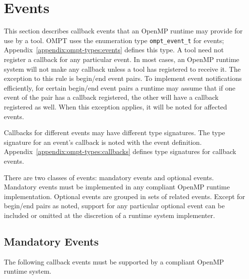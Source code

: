 \documentclass{article}
\newcommand{\descheader}[1]{{\needspace{3\baselineskip}\vspace{1em}\noindent \fbox{#1}}}
\begin{document}
\section{Events}
\label{sec:events} 

This section describes callback events that an OpenMP runtime 
may provide for use by a tool. OMPT uses the enumeration type \verb|ompt_event_t| for events; 
Appendix~\ref{appendix:ompt-types:events} defines this type. 
A tool need not register a callback for any particular event.
In most cases, an OpenMP runtime system will not make any callback unless a  tool has registered to receive it. The exception to this rule is begin/end event pairs. 
To implement event notifications efficiently, for certain begin/end event pairs a runtime may assume that if one event of the pair has a callback registered, the other will have a callback registered as well. When this exception applies, it will be noted for affected events.

Callbacks for different events may have different type signatures. 
The type signature for an event's callback is noted with the event definition.  Appendix~\ref{appendix:ompt-types:callbacks} defines type signatures for callback events.


There are two classes of events: mandatory events and optional events.
Mandatory events must be implemented in any compliant OpenMP runtime implementation. 
Optional events are grouped in sets of related events. Except for begin/end pairs as noted, support for any particular optional event can be included or omitted at the 
discretion of a runtime system implementer. 


\subsection{Mandatory Events}

 The following callback events must be supported by a compliant OpenMP 
 runtime system. 

\descheader{Threads}
\end{document}
